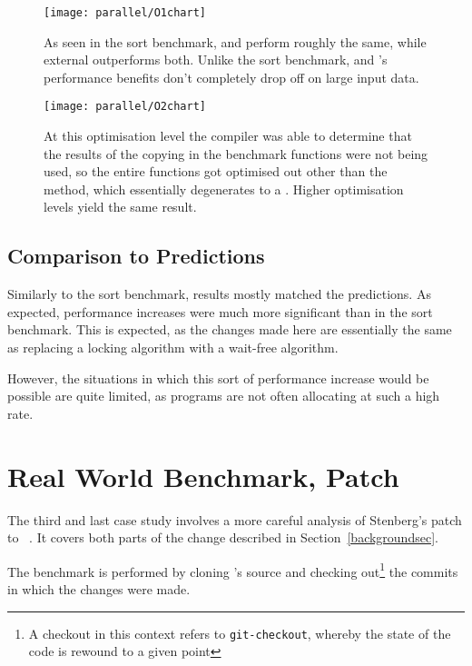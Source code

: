 \begin{figure}[p]
	\centering
	\texttt{[image: parallel/O1chart]}
	\caption{As seen in the sort benchmark,  and  perform roughly the same, while external outperforms both. Unlike the sort benchmark,  and 's performance benefits don't completely drop off on large input data.}
\end{figure}

\begin{figure}[p]
	\centering
	\texttt{[image: parallel/O2chart]}
	\caption{At this optimisation level the compiler was able to determine that the results of the copying in the benchmark functions were not being used, so the entire functions got optimised out other than the  method, which essentially degenerates to a . Higher optimisation levels yield the same result.}\label{lastparallel}
\end{figure}

\subsection{Comparison to Predictions}

Similarly to the sort benchmark, results mostly matched the predictions. As expected, performance increases were much more significant than in the sort benchmark. This is expected, as the changes made here are essentially the same as replacing a locking algorithm with a wait-free algorithm.

However, the situations in which this sort of performance increase would be possible are quite limited, as programs are not often allocating at such a high rate.

\pagebreak

\section{Real World Benchmark,  Patch}

The third and last case study involves a more careful analysis of Stenberg's patch to ~\cite{curlmalloc}. It covers both parts of the change described in Section~\ref{backgroundsec}.

The benchmark is performed by cloning 's source and checking out\footnote{A checkout in this context refers to \texttt{git-checkout}, whereby the state of the code is rewound to a given point} the commits in which the changes were made.

